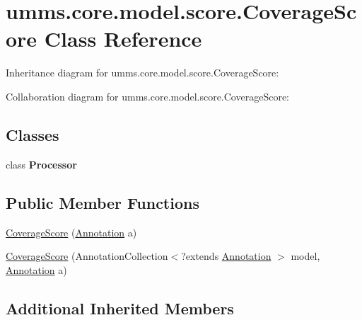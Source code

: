 \hypertarget{classumms_1_1core_1_1model_1_1score_1_1_coverage_score}{\section{umms.\+core.\+model.\+score.\+Coverage\+Score Class Reference}
\label{classumms_1_1core_1_1model_1_1score_1_1_coverage_score}
}


Inheritance diagram for umms.\+core.\+model.\+score.\+Coverage\+Score\+:


Collaboration diagram for umms.\+core.\+model.\+score.\+Coverage\+Score\+:
\subsection*{Classes}
\begin{DoxyCompactItemize}
\item 
class {\bfseries Processor}
\end{DoxyCompactItemize}
\subsection*{Public Member Functions}
\begin{DoxyCompactItemize}
\item 
\hyperlink{classumms_1_1core_1_1model_1_1score_1_1_coverage_score_a6f6d0a2817cc70044542a6fd94a31143}{Coverage\+Score} (\hyperlink{interfaceumms_1_1core_1_1annotation_1_1_annotation}{Annotation} a)
\item 
\hyperlink{classumms_1_1core_1_1model_1_1score_1_1_coverage_score_a12c3c7d812c9ff5863cfeacfe4b427e8}{Coverage\+Score} (Annotation\+Collection$<$?extends \hyperlink{interfaceumms_1_1core_1_1annotation_1_1_annotation}{Annotation} $>$ model, \hyperlink{interfaceumms_1_1core_1_1annotation_1_1_annotation}{Annotation} a)
\end{DoxyCompactItemize}
\subsection*{Additional Inherited Members}



